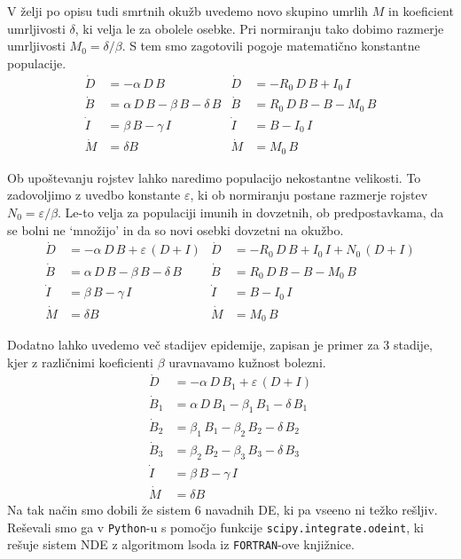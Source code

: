 V želji po opisu tudi smrtnih okužb uvedemo novo skupino umrlih $M$ in koeficient umrljivosti $\delta$, ki velja le za obolele osebke. Pri normiranju tako dobimo razmerje umrljivosti $M_0 = \delta / \beta$. S tem smo zagotovili pogoje matematično konstantne populacije.
\begin{align}\label{eqn:5}
    \dot D &= -\alpha \, D \, B & \dot D &= -R_0 \, D \, B + I_0 \, I\\ \nonumber
    \dot B &= \alpha \, D \, B - \beta \, B - \delta \, B & \dot B &= R_0 \, D \, B - B - M_0 \, B \\ \nonumber
    \dot I &= \beta \, B - \gamma \, I & \dot I &= B - I_0 \, I \\ \nonumber
    \dot M &= \delta B & \dot M &= M_0 \, B
\end{align}

Ob upoštevanju rojstev lahko naredimo populacijo nekostantne velikosti. To zadovoljimo z uvedbo konstante $\varepsilon$, ki ob normiranju postane razmerje rojstev $N_0 = \varepsilon / \beta$. Le-to velja za populaciji imunih in dovzetnih, ob predpostavkama, da se bolni ne ‘množijo’ in da so novi osebki dovzetni na okužbo.
\begin{align}\label{eqn:6}
    \dot D &= -\alpha \, D \, B + \varepsilon \, (D+I) & \dot D &= -R_0 \, D \, B + I_0 \, I + N_0 \, (D+I)\\ \nonumber
    \dot B &= \alpha \, D \, B - \beta \, B - \delta \, B & \dot B &= R_0 \, D \, B - B - M_0 \, B \\ \nonumber
    \dot I &= \beta \, B - \gamma \, I & \dot I &= B - I_0 \, I \\ \nonumber
    \dot M &= \delta B & \dot M &= M_0 \, B
\end{align}

Dodatno lahko uvedemo več stadijev epidemije, zapisan je primer za 3 stadije, kjer z različnimi koeficienti $\beta$ uravnavamo kužnost bolezni.
\begin{align}\label{eqn:6}
    \dot D &= -\alpha \, D \, B_1 + \varepsilon \, (D+I) \\ \nonumber
    \dot B_1 &= \alpha \, D \, B_1 - \beta_1 \, B_1 - \delta \, B_1 \\ \nonumber
    \dot B_2 &=  \beta_1 \, B_1- \beta_2 \, B_2 - \delta \, B_2 \\ \nonumber
    \dot B_3 &=  \beta_2 \, B_2 - \beta_3 \, B_3 - \delta \, B_3 \\ \nonumber
    \dot I &= \beta \, B - \gamma \, I \\ \nonumber
    \dot M &= \delta B
\end{align}
Na tak način smo dobili že sistem 6 navadnih DE, ki pa vseeno ni težko rešljiv. Reševali smo ga v \texttt{Python}-u s pomočjo funkcije \texttt{scipy.integrate.odeint}, ki rešuje sistem NDE z algoritmom lsoda iz \texttt{FORTRAN}-ove knjižnice.

